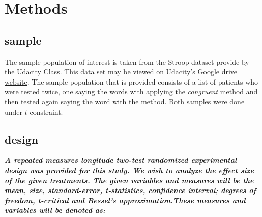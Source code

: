 \documentclass[8pt]{article}
\newcommand{\8}{\bar}
\begin{document}
\section{Methods}
\subsection{sample} 
The sample population of interest is taken from the Stroop dataset provide by the Udacity Class. This data set may be viewed on Udacity's Google drive \href{https://drive.google.com/file/d/0B9Yf01UaIbUgQXpYb2NhZ29yX1U/view}{website}. The sample population that is provided consists of a list of patients who were tested twice, one saying the words with applying the \textit{congruent} method and then tested again saying the word with the  method. Both samples were done under $t$ constraint. 
\subsection{design} 
\textbf{\textit{A repeated measures longitude two-test randomized experimental design was provided for this study. We wish to analyze the effect size of the given treatments. The given variables  and measures will be the mean, size, standard-error, t-statistics, confidence interval; degrees of freedom, t-critical and Bessel's approximation.These measures and variables will be denoted as:}}
\newline
\newline
\newline
\end{document}
